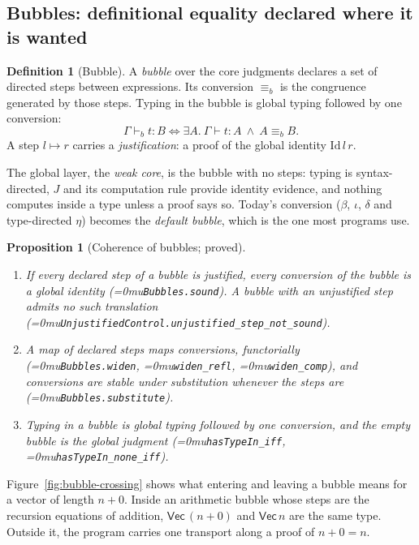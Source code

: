 \documentclass[11pt]{article}
\newcommand{\leanname}[1]{\textup{\Urlmuskip=0mu\relax\nolinkurl{#1}}}
\newtheorem{proposition}[theorem]{Proposition}
\theoremstyle{definition}
\newtheorem{definition}[theorem]{Definition}
\theoremstyle{remark}
\begin{document}
\subsection{Bubbles: definitional equality declared where it is wanted}

\begin{definition}[Bubble]
A \emph{bubble} over the core judgments declares a set of directed steps
between expressions. Its conversion $\equiv_b$ is the congruence generated by
those steps. Typing in the bubble is global typing followed by one conversion:
\[
  \Gamma \vdash_b t : B \iff \exists A.\ \Gamma \vdash t : A \ \wedge\
  A \equiv_b B .
\]
A step $l \mapsto r$ carries a \emph{justification}: a proof of the global
identity $\mathrm{Id}\,l\,r$.
\end{definition}

The global layer, the \emph{weak core}, is the bubble with no steps: typing is
syntax-directed, $J$ and its computation rule provide identity evidence, and
nothing computes inside a type unless a proof says so. Today's conversion
($\beta$, $\iota$, $\delta$ and type-directed $\eta$) becomes the \emph{default
bubble}, which is the one most programs use.

\begin{proposition}[Coherence of bubbles; proved]
\leavevmode
\begin{enumerate}[leftmargin=*]
\item If every declared step of a bubble is justified, every conversion of the
  bubble is a global identity (\leanname{Bubbles.sound}). A bubble with an
  unjustified step admits no such translation
  (\leanname{UnjustifiedControl.unjustified_step_not_sound}).
\item A map of declared steps maps conversions, functorially
  (\leanname{Bubbles.widen}, \leanname{widen_refl}, \leanname{widen_comp}),
  and conversions are stable under substitution whenever the steps are
  (\leanname{Bubbles.substitute}).
\item Typing in a bubble is global typing followed by one conversion, and the
  empty bubble is the global judgment (\leanname{hasTypeIn_iff},
  \leanname{hasTypeIn_none_iff}).
\end{enumerate}
\end{proposition}

Figure~\ref{fig:bubble-crossing} shows what entering and leaving a bubble
means for a vector of length $n+0$. Inside an arithmetic bubble whose steps are
the recursion equations of addition, $\mathsf{Vec}\,(n+0)$ and
$\mathsf{Vec}\,n$ are the same type. Outside it, the program carries one
transport along a proof of $n+0 = n$.
\end{document}

